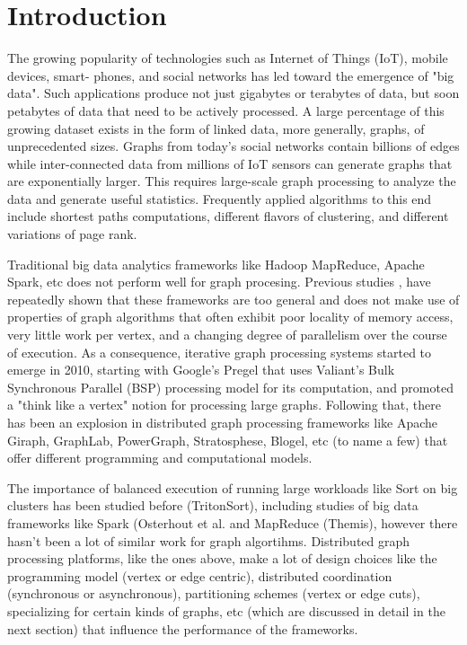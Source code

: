 \section{Introduction}
\label{sec:intro}

The growing popularity of technologies such as Internet of Things (IoT), mobile devices, smart-
phones, and social networks has led toward the emergence of "big data". Such applications 
produce not just gigabytes or terabytes of data, but soon petabytes of data that need to be 
actively processed. A large percentage of this growing dataset exists in the form of linked data, 
more generally, graphs, of unprecedented sizes. Graphs from today's social networks contain
billions of edges while inter-connected data from millions of IoT sensors can generate graphs
that are exponentially larger. This requires large-scale graph processing to analyze the data 
and generate useful statistics. Frequently applied algorithms to this end include shortest paths 
computations, different flavors of clustering, and different variations of page rank.

Traditional big data analytics frameworks like Hadoop MapReduce\cite{Dean04}, 
Apache Spark\cite{Zaharia:2012:RDD:2228298.2228301}, etc does not
perform well for graph procesing. Previous studies \cite{Ammar:2018:EAD:3231751.3242935}, 
\cite{Guo:2014:WGP:2650283.2650530} have repeatedly shown that these frameworks are too general 
and does not make use of properties of graph algorithms that often exhibit poor locality of memory access, 
very little work per vertex, and a changing degree of parallelism over the course of execution.
As a consequence, iterative graph processing systems started to emerge in 2010, starting with Google's 
Pregel\cite{Malewicz:2010:PSL:1807167.1807184} that uses Valiant's Bulk Synchronous Parallel (BSP) 
processing model for its computation, and promoted a "think like a vertex" notion for processing large 
graphs. Following that, there has been an explosion in distributed graph processing frameworks like 
Apache Giraph\cite{ApacheGiraph}, GraphLab\cite{GraphLab}, PowerGraph\cite{PowerGraph}, 
Stratosphese\cite{Stratosphere}, Blogel\cite{Blogel}, etc (to name a few) that offer different 
programming and computational models.

The importance of balanced execution of running large workloads like Sort on big clusters has been 
studied before (TritonSort\cite{Rasmussen:2013:TBE:2427631.2427634}), including studies of 
big data frameworks like Spark (Osterhout et al.\cite{Ousterhout:2015:MSP:2789770.2789791} and 
MapReduce (Themis\cite{Rasmussen:2012:TIM:2391229.2391242}), however there hasn't been a lot of 
similar work for graph algortihms. Distributed graph processing platforms, like the ones above, make a 
lot of design choices like the programming model (vertex or edge centric), distributed coordination
(synchronous or asynchronous), partitioning schemes (vertex or edge cuts), specializing for certain kinds 
of graphs, etc (which are discussed in detail in the next section) that influence the performance 
of the frameworks. 


